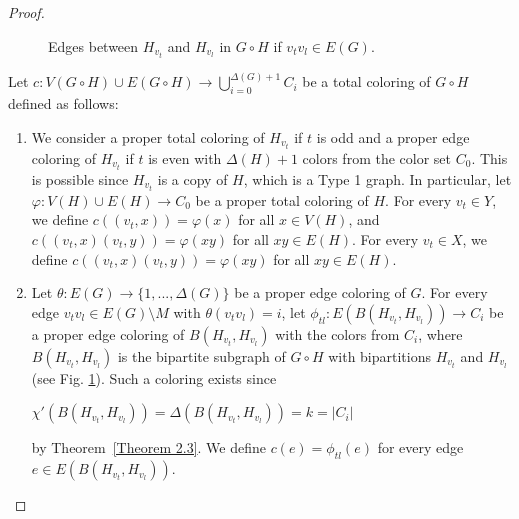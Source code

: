 \documentclass[12pt]{article}
\theoremstyle{definition}
\begin{document}
\begin{proof}
\begin{figure}[ht]
    \caption{Edges between $H_{v_t}$ and $H_{v_l}$ in $G \circ H$ if $v_t v_l \in E(G)$.}
    \label{Figure 2}
\end{figure}



Let $c:V(G\circ H)\cup E(G\circ H)\rightarrow \bigcup\limits_{i=0}^{\Delta(G)+1} C_i$ be a total coloring of $G\circ H$ defined as follows:

\begin{enumerate}
\item  We consider a proper total coloring of $H_{v_t}$ if $t$ is odd and a proper edge coloring of $H_{v_t}$ if $t$ is even with $\Delta(H)+1$ colors from the color set $C_0$. This is possible since $H_{v_t}$ is a copy of $H$, which is a Type 1 graph.
In particular, let $\varphi:V(H)\cup E(H)\rightarrow C_0$ be a proper total coloring of $H$. 
For every $v_t\in Y$, we define
$c((v_t,x))=\varphi(x)$ for all $x\in V(H)$,
and
$c((v_t,x)(v_t,y))=\varphi(xy)$ for all $xy\in E(H)$. For every $v_t\in X$, we define $c((v_t,x)(v_t,y))=\varphi(xy)$ for all $xy\in E(H)$.

\item Let $\theta:E(G)\rightarrow \{1,...,\Delta(G)\}$ be a proper edge coloring of $G$.
For every edge $v_tv_l\in E(G)\setminus M$ with
$\theta(v_tv_l)=i$, let $\phi_{tl}: E(B(H_{v_t},H_{v_l})) \rightarrow C_i$ be a proper edge coloring of $B(H_{v_t},H_{v_l})$ with the colors from $C_i$, where $B(H_{v_t},H_{v_l})$ is the bipartite subgraph  of $G\circ H$ with bipartitions $H_{v_t}$ and $H_{v_l}$ (see Fig. \ref{Figure 2}). Such a coloring exists since 
\begin{center}
$\chi'(B(H_{v_t},H_{v_l}))=
\Delta(B(H_{v_t},H_{v_l}))=
k=|C_i|$
\end{center}
by Theorem~\ref{Theorem 2.3}.
We define $c(e)=\phi_{tl}(e)$ for every edge $e\in E(B(H_{v_t},H_{v_l}))$.


\end{enumerate}
\end{proof}
\end{document}
